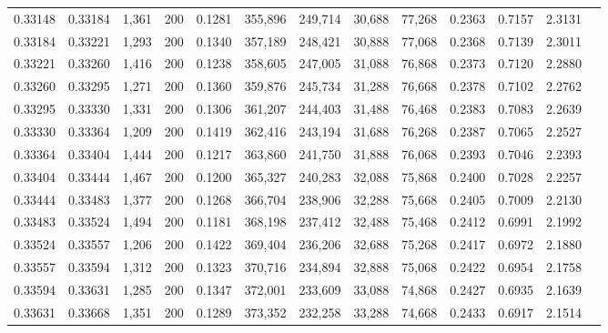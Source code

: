 \begin{tabular}{rrrrrrrrrrrrr}
0.33148 & 0.33184 & 1,361 & 200 &                                     0.1281 & 355,896 & 249,714 &  30,688 &  77,268 & 0.2363 & 0.7157 & 2.3131 \\
0.33184 & 0.33221 & 1,293 & 200 &                                     0.1340 & 357,189 & 248,421 &  30,888 &  77,068 & 0.2368 & 0.7139 & 2.3011 \\
0.33221 & 0.33260 & 1,416 & 200 &                                     0.1238 & 358,605 & 247,005 &  31,088 &  76,868 & 0.2373 & 0.7120 & 2.2880 \\
0.33260 & 0.33295 & 1,271 & 200 &                                     0.1360 & 359,876 & 245,734 &  31,288 &  76,668 & 0.2378 & 0.7102 & 2.2762 \\
0.33295 & 0.33330 & 1,331 & 200 &                                     0.1306 & 361,207 & 244,403 &  31,488 &  76,468 & 0.2383 & 0.7083 & 2.2639 \\
0.33330 & 0.33364 & 1,209 & 200 &                                     0.1419 & 362,416 & 243,194 &  31,688 &  76,268 & 0.2387 & 0.7065 & 2.2527 \\
0.33364 & 0.33404 & 1,444 & 200 &                                     0.1217 & 363,860 & 241,750 &  31,888 &  76,068 & 0.2393 & 0.7046 & 2.2393 \\
0.33404 & 0.33444 & 1,467 & 200 &                                     0.1200 & 365,327 & 240,283 &  32,088 &  75,868 & 0.2400 & 0.7028 & 2.2257 \\
0.33444 & 0.33483 & 1,377 & 200 &                                     0.1268 & 366,704 & 238,906 &  32,288 &  75,668 & 0.2405 & 0.7009 & 2.2130 \\
0.33483 & 0.33524 & 1,494 & 200 &                                     0.1181 & 368,198 & 237,412 &  32,488 &  75,468 & 0.2412 & 0.6991 & 2.1992 \\
0.33524 & 0.33557 & 1,206 & 200 &                                     0.1422 & 369,404 & 236,206 &  32,688 &  75,268 & 0.2417 & 0.6972 & 2.1880 \\
0.33557 & 0.33594 & 1,312 & 200 &                                     0.1323 & 370,716 & 234,894 &  32,888 &  75,068 & 0.2422 & 0.6954 & 2.1758 \\
0.33594 & 0.33631 & 1,285 & 200 &                                     0.1347 & 372,001 & 233,609 &  33,088 &  74,868 & 0.2427 & 0.6935 & 2.1639 \\
0.33631 & 0.33668 & 1,351 & 200 &                                     0.1289 & 373,352 & 232,258 &  33,288 &  74,668 & 0.2433 & 0.6917 & 2.1514 \\

\end{tabular}
